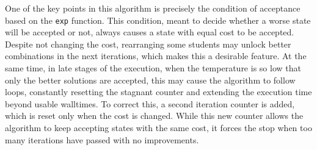 One of the key points in this algorithm is precisely the condition of acceptance based on the \texttt{exp} function. This condition, meant to decide whether a worse state will be accepted or not, always causes a state with equal cost to be accepted. Despite not changing the cost, rearranging some students may unlock better combinations in the next iterations, which makes this a desirable feature. At the same time, in late stages of the execution, when the temperature is so low that only the better solutions are accepted, this may cause the algorithm to follow loops, constantly resetting the stagnant counter and extending the execution time beyond usable walltimes. To correct this, a second iteration counter is added, which is reset only when the cost is changed. While this new counter allows the algorithm to keep accepting states with the same cost, it forces the stop when too many iterations have passed with no improvements.

